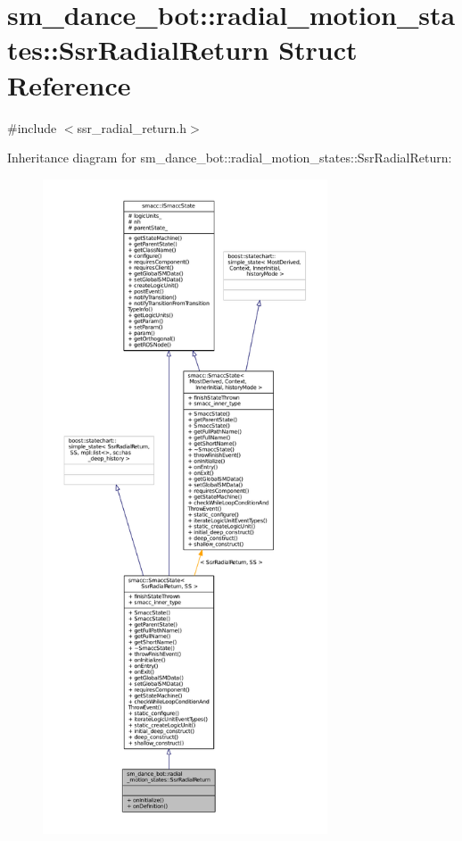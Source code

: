 \hypertarget{structsm__dance__bot_1_1radial__motion__states_1_1SsrRadialReturn}{}\section{sm\+\_\+dance\+\_\+bot\+:\+:radial\+\_\+motion\+\_\+states\+:\+:Ssr\+Radial\+Return Struct Reference}
\label{structsm__dance__bot_1_1radial__motion__states_1_1SsrRadialReturn}


{\ttfamily \#include $<$ssr\+\_\+radial\+\_\+return.\+h$>$}



Inheritance diagram for sm\+\_\+dance\+\_\+bot\+:\+:radial\+\_\+motion\+\_\+states\+:\+:Ssr\+Radial\+Return\+:
\nopagebreak
\begin{figure}[H]
\begin{center}
\leavevmode
\includegraphics[height=550pt]{structsm__dance__bot_1_1radial__motion__states_1_1SsrRadialReturn__inherit__graph}
\end{center}
\end{figure}


